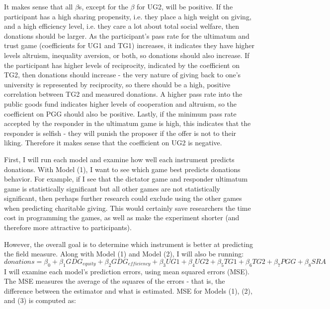 \documentclass{article}
\begin{document}
It makes sense that all \(\beta\)s, except for the \(\beta\) for UG2, will be positive. If the participant has a high sharing propensity, i.e. they place a high weight on giving, and a high efficiency level, i.e. they care a lot about total social welfare, then donations should be larger. As the participant\rq s pass rate for the ultimatum and trust game (coefficients for UG1 and TG1) increases, it indicates they have higher levels altruism, inequality aversion, or both, so donations should also increase. If the participant has higher levels of reciprocity, indicated by the coefficient on TG2, then donations should increase - the very nature of giving back to one's university is represented by reciprocity, so there should be a high, positive correlation between TG2 and measured donations. A higher pass rate into the public goods fund indicates higher levels of cooperation and altruism, so the coefficient on PGG should also be positive. Lastly, if the minimum pass rate accepted by the responder in the ultimatum game is high, this indicates that the responder is selfish - they will punish the proposer if the offer is not to their liking. Therefore it makes sense that the coefficient on UG2 is negative. 

First, I will run each model and examine how well each instrument predicts donations. With Model (1), I want to see which game best predicts donations behavior. For example, if I see that the dictator game and responder ultimatum game is statistically significant but all other games are not statistically significant, then perhaps further research could exclude using the other games when predicting charitable giving. This would certainly save researchers the time cost in programming the games, as well as make the experiment shorter (and therefore more attractive to participants). 

However, the overall goal is to determine which instrument is better at predicting the field measure. Along with Model (1) and Model (2), I will also be running:
\begin{equation}
donations=\beta_{0} + \beta_{1} GDG_{equity} + \beta_{2} GDG_{efficiency} + \beta_{3} UG1 + \beta_{4} UG2 + \beta_{5} TG1 + \beta_{6} TG2 + \beta_{7} PGG + \beta_{8}SRA
\end{equation}
I will examine each model's prediction errors, using mean squared errors (MSE). The MSE measures the average of the squares of the errors - that is, the difference between the estimator and what is estimated. MSE for Models (1), (2), and (3) is computed as: \\
\end{document}
